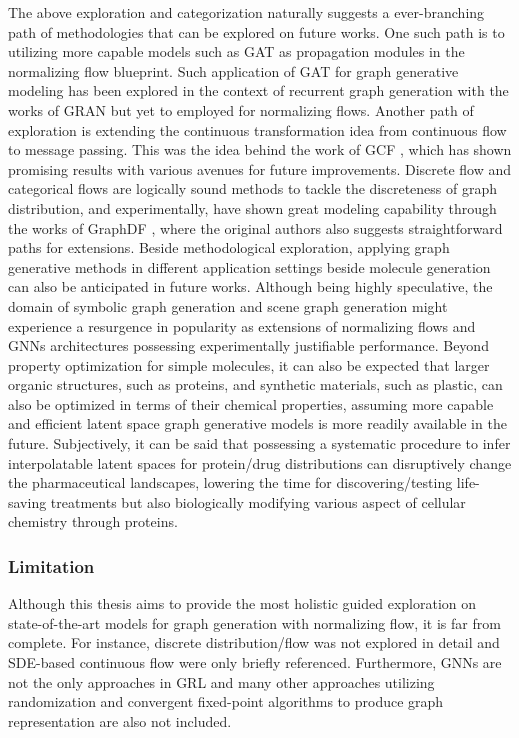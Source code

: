 The above exploration and categorization naturally suggests a ever-branching
path of methodologies that can be explored on future works. One such path is to
utilizing more capable models such as GAT
\citep{velickovicGraphAttentionNetworks2018} as propagation modules in the
normalizing flow blueprint. Such application of GAT for graph generative
modeling has been explored in the context of recurrent graph generation with the
works of GRAN \citep{liaoEfficientGraphGeneration2019} but yet to employed for
normalizing flows. Another path of exploration is extending the continuous
transformation idea from continuous flow to message passing. This was the idea
behind the work of GCF \citep{dengContinuousGraphFlow2019}, which has shown
promising results with various avenues for future improvements. Discrete flow
and categorical flows are logically sound methods to tackle the discreteness of
graph distribution, and experimentally, have shown great modeling capability
through the works of GraphDF \citep{luoGraphDFDiscreteFlow2021}, where the
original authors also suggests straightforward paths for extensions. Beside
methodological exploration, applying graph generative methods in different
application settings beside molecule generation can also be anticipated in
future works. Although being highly speculative, the domain of symbolic graph
generation and scene graph generation might experience a resurgence in
popularity as extensions of normalizing flows and GNNs architectures possessing
experimentally justifiable performance. Beyond property optimization for simple
molecules, it can also be expected that larger organic structures, such as
proteins, and synthetic materials, such as plastic, can also be optimized in
terms of their chemical properties, assuming more capable and efficient latent
space graph generative models is more readily available in the future.
Subjectively, it can be said that possessing a systematic procedure to infer
interpolatable latent spaces for protein/drug distributions can disruptively
change the pharmaceutical landscapes, lowering the time for discovering/testing
life-saving treatments but also biologically modifying various aspect of
cellular chemistry through proteins.


\subsubsection{Limitation} Although this thesis aims to provide the most
holistic guided exploration on state-of-the-art models for graph generation with
normalizing flow, it is far from complete. For instance, discrete
distribution/flow was not explored in detail and SDE-based continuous flow were
only briefly referenced. Furthermore, GNNs are not the only approaches in GRL
and many other approaches utilizing randomization and convergent fixed-point
algorithms to produce graph representation are also not included.

